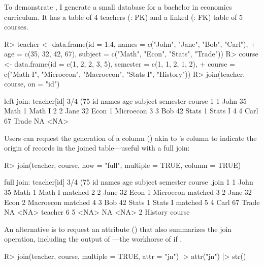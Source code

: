 \documentclass[article]{jss} %
\newcommand{\fct}[1]{\code{#1()}}
\begin{document}
To demonstrate \fct{join}, I generate a small database for a bachelor in economics curriculum. It has a  table of 4 teachers (: PK) and a linked (: FK)  table of 5 courses.
%
\begin{Schunk}
\begin{Sinput}
R> teacher <- data.frame(id = 1:4, names = c("John", "Jane", "Bob", "Carl"),
+    age = c(35, 32, 42, 67), subject = c("Math", "Econ", "Stats", "Trade"))
R> course <- data.frame(id = c(1, 2, 2, 3, 5), semester = c(1, 1, 2, 1, 2),
+    course = c("Math I", "Microecon", "Macroecon", "Stats I", "History"))
R> join(teacher, course, on = "id")
\end{Sinput}
\begin{Soutput}
left join: teacher[id] 3/4 (75%) <1:1st> course[id] 3/5 (60%)
  id names age subject semester    course
1  1  John  35    Math        1    Math I
2  2  Jane  32    Econ        1 Microecon
3  3   Bob  42   Stats        1   Stats I
4  4  Carl  67   Trade       NA      <NA>
\end{Soutput}
\end{Schunk}
%
Users can request the generation of a  column () akin to 's  column to indicate the origin of records in the joined table---useful with a full join:
%
\begin{Schunk}
\begin{Sinput}
R> join(teacher, course, how = "full", multiple = TRUE, column = TRUE)
\end{Sinput}
\begin{Soutput}
full join: teacher[id] 3/4 (75%) <1:1.33> course[id] 4/5 (80%)
  id names age subject semester    course   .join
1  1  John  35    Math        1    Math I matched
2  2  Jane  32    Econ        1 Microecon matched
3  2  Jane  32    Econ        2 Macroecon matched
4  3   Bob  42   Stats        1   Stats I matched
5  4  Carl  67   Trade       NA      <NA> teacher
6  5  <NA>  NA    <NA>        2   History  course
\end{Soutput}
\end{Schunk}
%
An alternative is to request an attribute () that also summarizes the join operation, including the output of \fct{fmatch}---the workhorse of \fct{join} if .
\begin{Code}
R> join(teacher, course, multiple = TRUE, attr = "jn") |> attr("jn") |> str()
\end{Code}
\begin{Schunk}
\end{Schunk}
\end{document}
